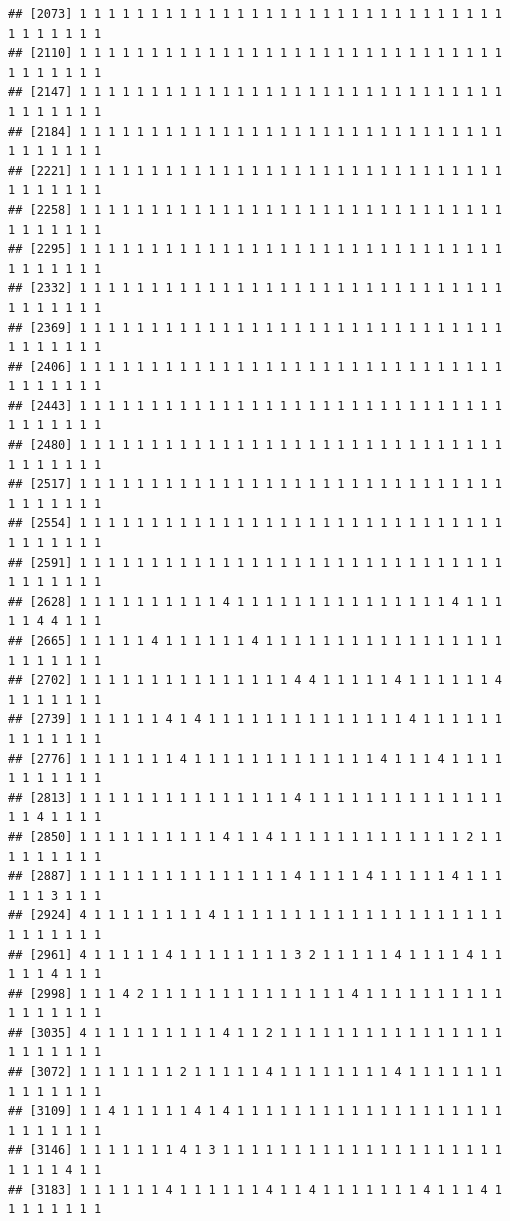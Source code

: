 \documentclass[
]{article}
\begin{document}
\begin{verbatim}
## [2073] 1 1 1 1 1 1 1 1 1 1 1 1 1 1 1 1 1 1 1 1 1 1 1 1 1 1 1 1 1 1 1 1 1 1 1 1 1
## [2110] 1 1 1 1 1 1 1 1 1 1 1 1 1 1 1 1 1 1 1 1 1 1 1 1 1 1 1 1 1 1 1 1 1 1 1 1 1
## [2147] 1 1 1 1 1 1 1 1 1 1 1 1 1 1 1 1 1 1 1 1 1 1 1 1 1 1 1 1 1 1 1 1 1 1 1 1 1
## [2184] 1 1 1 1 1 1 1 1 1 1 1 1 1 1 1 1 1 1 1 1 1 1 1 1 1 1 1 1 1 1 1 1 1 1 1 1 1
## [2221] 1 1 1 1 1 1 1 1 1 1 1 1 1 1 1 1 1 1 1 1 1 1 1 1 1 1 1 1 1 1 1 1 1 1 1 1 1
## [2258] 1 1 1 1 1 1 1 1 1 1 1 1 1 1 1 1 1 1 1 1 1 1 1 1 1 1 1 1 1 1 1 1 1 1 1 1 1
## [2295] 1 1 1 1 1 1 1 1 1 1 1 1 1 1 1 1 1 1 1 1 1 1 1 1 1 1 1 1 1 1 1 1 1 1 1 1 1
## [2332] 1 1 1 1 1 1 1 1 1 1 1 1 1 1 1 1 1 1 1 1 1 1 1 1 1 1 1 1 1 1 1 1 1 1 1 1 1
## [2369] 1 1 1 1 1 1 1 1 1 1 1 1 1 1 1 1 1 1 1 1 1 1 1 1 1 1 1 1 1 1 1 1 1 1 1 1 1
## [2406] 1 1 1 1 1 1 1 1 1 1 1 1 1 1 1 1 1 1 1 1 1 1 1 1 1 1 1 1 1 1 1 1 1 1 1 1 1
## [2443] 1 1 1 1 1 1 1 1 1 1 1 1 1 1 1 1 1 1 1 1 1 1 1 1 1 1 1 1 1 1 1 1 1 1 1 1 1
## [2480] 1 1 1 1 1 1 1 1 1 1 1 1 1 1 1 1 1 1 1 1 1 1 1 1 1 1 1 1 1 1 1 1 1 1 1 1 1
## [2517] 1 1 1 1 1 1 1 1 1 1 1 1 1 1 1 1 1 1 1 1 1 1 1 1 1 1 1 1 1 1 1 1 1 1 1 1 1
## [2554] 1 1 1 1 1 1 1 1 1 1 1 1 1 1 1 1 1 1 1 1 1 1 1 1 1 1 1 1 1 1 1 1 1 1 1 1 1
## [2591] 1 1 1 1 1 1 1 1 1 1 1 1 1 1 1 1 1 1 1 1 1 1 1 1 1 1 1 1 1 1 1 1 1 1 1 1 1
## [2628] 1 1 1 1 1 1 1 1 1 1 4 1 1 1 1 1 1 1 1 1 1 1 1 1 1 1 4 1 1 1 1 1 4 4 1 1 1
## [2665] 1 1 1 1 1 4 1 1 1 1 1 1 4 1 1 1 1 1 1 1 1 1 1 1 1 1 1 1 1 1 1 1 1 1 1 1 1
## [2702] 1 1 1 1 1 1 1 1 1 1 1 1 1 1 1 4 4 1 1 1 1 1 4 1 1 1 1 1 1 4 1 1 1 1 1 1 1
## [2739] 1 1 1 1 1 1 4 1 4 1 1 1 1 1 1 1 1 1 1 1 1 1 1 4 1 1 1 1 1 1 1 1 1 1 1 1 1
## [2776] 1 1 1 1 1 1 1 4 1 1 1 1 1 1 1 1 1 1 1 1 1 4 1 1 1 4 1 1 1 1 1 1 1 1 1 1 1
## [2813] 1 1 1 1 1 1 1 1 1 1 1 1 1 1 1 4 1 1 1 1 1 1 1 1 1 1 1 1 1 1 1 1 4 1 1 1 1
## [2850] 1 1 1 1 1 1 1 1 1 1 4 1 1 4 1 1 1 1 1 1 1 1 1 1 1 1 1 2 1 1 1 1 1 1 1 1 1
## [2887] 1 1 1 1 1 1 1 1 1 1 1 1 1 1 1 4 1 1 1 1 4 1 1 1 1 1 4 1 1 1 1 1 1 3 1 1 1
## [2924] 4 1 1 1 1 1 1 1 1 4 1 1 1 1 1 1 1 1 1 1 1 1 1 1 1 1 1 1 1 1 1 1 1 1 1 1 1
## [2961] 4 1 1 1 1 1 4 1 1 1 1 1 1 1 1 3 2 1 1 1 1 1 4 1 1 1 1 4 1 1 1 1 1 4 1 1 1
## [2998] 1 1 1 4 2 1 1 1 1 1 1 1 1 1 1 1 1 1 1 4 1 1 1 1 1 1 1 1 1 1 1 1 1 1 1 1 1
## [3035] 4 1 1 1 1 1 1 1 1 1 4 1 1 2 1 1 1 1 1 1 1 1 1 1 1 1 1 1 1 1 1 1 1 1 1 1 1
## [3072] 1 1 1 1 1 1 1 2 1 1 1 1 1 4 1 1 1 1 1 1 1 1 4 1 1 1 1 1 1 1 1 1 1 1 1 1 1
## [3109] 1 1 4 1 1 1 1 1 4 1 4 1 1 1 1 1 1 1 1 1 1 1 1 1 1 1 1 1 1 1 1 1 1 1 1 1 1
## [3146] 1 1 1 1 1 1 1 4 1 3 1 1 1 1 1 1 1 1 1 1 1 1 1 1 1 1 1 1 1 1 1 1 1 1 4 1 1
## [3183] 1 1 1 1 1 1 4 1 1 1 1 1 1 4 1 1 4 1 1 1 1 1 1 1 4 1 1 1 4 1 1 1 1 1 1 1 1

\end{verbatim}
\end{document}
